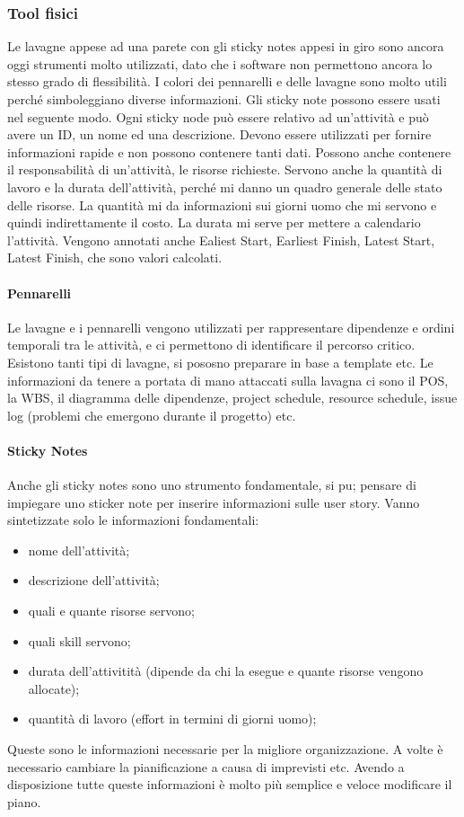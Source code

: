 \subsubsection{Tool fisici}
Le lavagne appese ad una parete con gli sticky notes appesi in giro sono ancora oggi strumenti molto utilizzati, dato che i software non permettono ancora lo stesso grado di flessibilità. I colori dei pennarelli e delle lavagne sono molto utili perché simboleggiano diverse informazioni. Gli sticky note possono essere usati nel seguente modo. Ogni sticky node può essere relativo ad un'attività e può avere un ID, un nome ed una descrizione. Devono essere utilizzati per fornire informazioni rapide e non possono contenere tanti dati. Possono anche contenere il responsabilità di un'attività, le risorse richieste. Servono anche la quantità di lavoro e la durata dell'attività, perché mi danno un quadro generale delle stato delle risorse. La quantità mi da informazioni sui giorni uomo che mi servono e quindi indirettamente il costo. La durata mi serve per mettere a calendario l'attività. Vengono annotati anche Ealiest Start, Earliest Finish, Latest Start, Latest Finish, che sono valori calcolati.
\paragraph{Pennarelli}
Le lavagne e i pennarelli vengono utilizzati per rappresentare dipendenze e ordini temporali tra le attività, e ci permettono di identificare il percorso critico.
Esistono tanti tipi di lavagne, si pososno preparare in base a template etc.
Le informazioni da tenere a portata di mano attaccati sulla lavagna ci sono il POS, la WBS, il diagramma delle dipendenze, project schedule, resource schedule, issue log (problemi che emergono durante il progetto) etc.
\paragraph{Sticky Notes}
Anche gli sticky notes sono uno strumento fondamentale, si pu; pensare di impiegare uno sticker note per inserire informazioni sulle user story. Vanno sintetizzate solo le informazioni fondamentali:
\begin{itemize}
	\item nome dell'attività;
	\item descrizione dell'attività;
	\item quali e quante risorse servono;
	\item quali skill servono;
	\item durata dell'attivitità (dipende da chi la esegue e quante risorse vengono allocate);
	\item quantità di lavoro (effort in termini di giorni uomo);
\end{itemize}
\noindent Queste sono le informazioni necessarie per la migliore organizzazione. A volte è necessario cambiare la pianificazione a causa di imprevisti etc. Avendo a disposizione tutte queste informazioni è molto più semplice e veloce modificare il piano.
